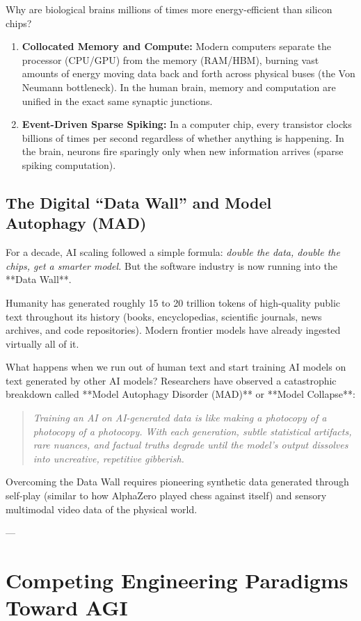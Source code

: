 \documentclass[11pt,journal,onecolumn]{IEEEtran}
\begin{document}
Why are biological brains millions of times more energy-efficient than silicon chips?
\begin{enumerate}
    \item \textbf{Collocated Memory and Compute:} Modern computers separate the processor (CPU/GPU) from the memory (RAM/HBM), burning vast amounts of energy moving data back and forth across physical buses (the Von Neumann bottleneck). In the human brain, memory and computation are unified in the exact same synaptic junctions.
    \item \textbf{Event-Driven Sparse Spiking:} In a computer chip, every transistor clocks billions of times per second regardless of whether anything is happening. In the brain, neurons fire sparingly only when new information arrives (sparse spiking computation).
\end{enumerate}

\subsection{The Digital ``Data Wall'' and Model Autophagy (MAD)}
For a decade, AI scaling followed a simple formula: \textit{double the data, double the chips, get a smarter model.} But the software industry is now running into the **Data Wall**.

Humanity has generated roughly 15 to 20 trillion tokens of high-quality public text throughout its history (books, encyclopedias, scientific journals, news archives, and code repositories). Modern frontier models have already ingested virtually all of it.

What happens when we run out of human text and start training AI models on text generated by other AI models?
Researchers have observed a catastrophic breakdown called **Model Autophagy Disorder (MAD)** or **Model Collapse**:
\begin{quote}
\textit{Training an AI on AI-generated data is like making a photocopy of a photocopy of a photocopy. With each generation, subtle statistical artifacts, rare nuances, and factual truths degrade until the model's output dissolves into uncreative, repetitive gibberish.}
\end{quote}
Overcoming the Data Wall requires pioneering synthetic data generated through self-play (similar to how AlphaZero played chess against itself) and sensory multimodal video data of the physical world.

---

\section{Competing Engineering Paradigms Toward AGI}
\label{sec:paradigms}
\end{document}
